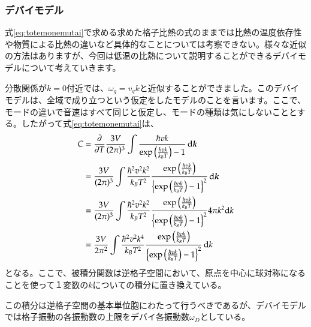 \documentclass[10pt,b5paper,papersize,dvipdfmx]{jsbook}
\begin{document}
\subsubsection*{デバイモデル}
式\ref{eq:totemonemutai}で求める求めた格子比熱の式のままでは比熱の温度依存性や物質による比熱の違いなど具体的なことについては考察できない。様々な近似の方法はありますが、今回は低温の比熱について説明することができるデバイモデルについて考えていきます。\par
分散関係が$k = 0$付近では、$\omega_q = v_q k$と近似することができました。このデバイモデルは、全域で成り立つという仮定をしたモデルのことを言います。ここで、モードの違いで音速はすべて同じと仮定し、モードの種類は気にしないこととする。したがって式\ref{eq:totemonemutai}は、
\begin{align}
  C &= \pdv{T} \frac{3V}{(2\pi)^3} \int\frac{\hbar v k}{\exp \left(\frac{\hbar v k}{k_BT}\right)-1 }\dd{\bm{k}}\\
  & = \frac{3V}{(2\pi)^3} \int \frac{\hbar^2 v^2 k ^2}{k_B T ^2}  \frac{\exp \left(\frac{\hbar v k}{k_BT}\right)}{\left\{\exp \left(\frac{\hbar v k}{k_BT}\right)-1 \right\}^2}\dd{\bm{k}}\\
  &= \frac{3V}{(2\pi)^3} \int \frac{\hbar^2 v^2 k ^2}{k_B T ^2}  \frac{\exp \left(\frac{\hbar v k}{k_BT}\right)}{\left\{\exp \left(\frac{\hbar v k}{k_BT}\right)-1 \right\}^2} 4 \pi k^2 \dd k\\
  &= \frac{3V}{2\pi^2} \int \frac{\hbar^2 v^2 k ^4}{k_B T ^2}  \frac{\exp \left(\frac{\hbar v k}{k_BT}\right)}{\left\{\exp \left(\frac{\hbar v k}{k_BT}\right)-1 \right\}^2}  \dd {k}
  \label{eq:daigakutoutyaku}
\end{align}
となる。ここで、被積分関数は逆格子空間において、原点を中心に球対称になることを使って１変数の$k$についての積分に置き換えている。\par
この積分は逆格子空間の基本単位胞にわたって行うべきであるが、デバイモデルでは格子振動の各振動数の上限をデバイ各振動数$\omega_D$としている。
\end{document}

